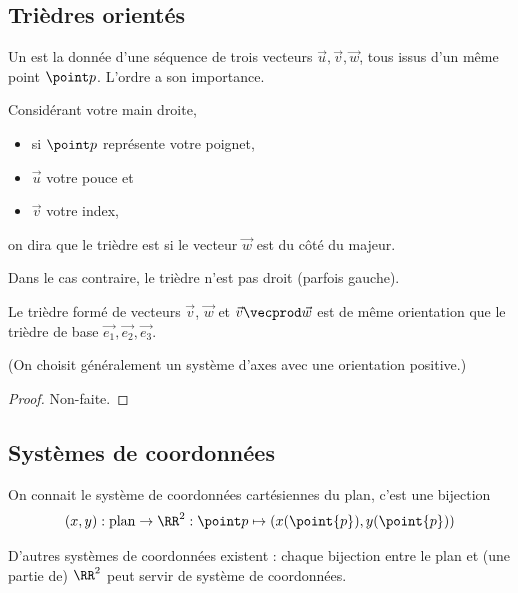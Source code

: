 \documentclass[french,xcolor=svgnames]{beamer}
\begin{document}
\subsection{Trièdres orientés}
\begin{frame}
  \begin{definition}
    Un  est la donnée d'une séquence de trois vecteurs \(\vec u, \vec v, \vec w\), tous issus d'un même point \(\point p\). L'ordre a son importance.
  \end{definition}\pause

  \begin{definition}
    Considérant votre main droite,
    \begin{itemize}
    \item si \(\point p\) représente votre poignet,
    \item \(\vec u\) votre pouce et
    \item \(\vec v\) votre index,
    \end{itemize}
    on dira que le trièdre est  si le vecteur \(\vec w\) est du côté du majeur.

    Dans le cas contraire, le trièdre n'est pas droit (parfois \og gauche\fg{}).
  \end{definition}
  
\end{frame}
\begin{frame}
\begin{proposition}
    Le trièdre formé de vecteurs \(\vec v\), \(\vec w\) et \(\vec v \vecprod \vec w\) est de même orientation que le trièdre \og de base\fg{} \(\vec {e_{1}},\vec{e_{2}},\vec{e_{3}}\).
  \end{proposition}
  (On choisit généralement un système d'axes avec une orientation positive.)
  \begin{proof}
    Non-faite.
  \end{proof}
\end{frame}

\subsection{Systèmes de coordonnées}
\begin{frame}
  On connait le système de coordonnées cartésiennes du plan, c'est une bijection
  \begin{equation*}
    (x,y) : \text{plan} \to \RR^2 : \point p \mapsto (x(\point{p}),y(\point{p}))
  \end{equation*}

  D'autres systèmes de coordonnées existent : chaque bijection entre le plan et (une partie de) \(\RR^{2}\) peut servir de système de coordonnées.
\end{frame}
\end{document}
